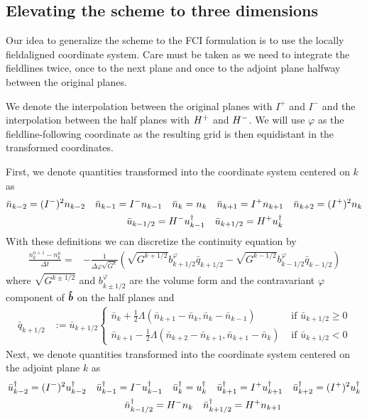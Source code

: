 \subsection{Elevating the scheme to three dimensions}
Our idea to generalize the scheme to the FCI formulation is to use the
locally fieldaligned coordinate system.
Care must be taken as we need to integrate the fieldlines twice, once to the
next plane and once to the adjoint plane halfway between the original planes.

We denote the interpolation between the original planes with $I^+$ and $I^-$ and
the interpolation between the half planes with $H^+$ and $H^-$.
We will use $\varphi$ as the fieldline-following coordinate as the resulting
grid is then equidistant in the transformed coordinates.

First, we denote quantities transformed into the coordinate system centered on $k$ as
\begin{align}
    \bar n_{k-2} = (I^-)^2n_{k-2} \quad \bar n_{k-1} = I^- n_{k-1}
    \quad \bar n_k = n_k \quad
    \bar n_{k+1} = I^+n_{k+1} \quad \bar n_{k+2} = (I^+)^2 n_k \nonumber\\
\bar u_{k-1/2} = H^- u_{k-1}^\dagger \quad \bar u_{k+1/2} = H^+ u_k^\dagger \qquad\qquad\qquad\qquad
\end{align}
With these definitions we can discretize the continuity equation by
\begin{align}
    \frac{n_k^{n+1} - n_k^n}{\Delta t} = &-\frac{1}{\Delta\varphi \sqrt{G^k}}
    \left( \sqrt{G^{k+1/2}}b^\varphi_{k+1/2}  \bar q_{k+1/2}
    -\sqrt{G^{k-1/2}}b^\varphi_{k-1/2}  \bar q_{k-1/2} \right)
\end{align}
where $\sqrt{G^{k\pm 1/2}}$ and $b^\varphi_{k\pm 1/2}$ are the volume form and
the contravariant $\varphi$ component of $\bm{\hat{b}}$ on the half planes and
\begin{align}
    \bar q_{k+1/2} &:= \bar u_{k+1/2} \begin{cases}
        \bar n_k     + \frac{1}{2}\Lambda( \bar n_{k+1}-\bar n_k    , \bar n_k - \bar n_{k-1})&\text{ if } \bar u_{k+1/2} \geq 0 \\
        \bar n_{k+1} - \frac{1}{2}\Lambda( \bar n_{k+2}-\bar n_{k+1}, \bar n_{k+1} - \bar n_k)&\text{ if } \bar u_{k+1/2} < 0
    \end{cases}
\end{align}
Next, we denote quantities transformed into the coordinate system centered on the adjoint plane $k$ as
\begin{align}
    \bar u^\dagger_{k-2} = (I^-)^2u^\dagger_{k-2} \quad \bar u^\dagger_{k-1} = I^- u^\dagger_{k-1}
    \quad \bar u^\dagger_k = u^\dagger_k \quad
    \bar u^\dagger_{k+1} = I^+u^\dagger_{k+1} \quad \bar u^\dagger_{k+2} = (I^+)^2 u^\dagger_k \nonumber\\
    \bar n^\dagger_{k-1/2} = H^- n_{k} \quad \bar n^\dagger_{k+1/2} = H^+ n_{k+1} \qquad\qquad\qquad\qquad
\end{align}
